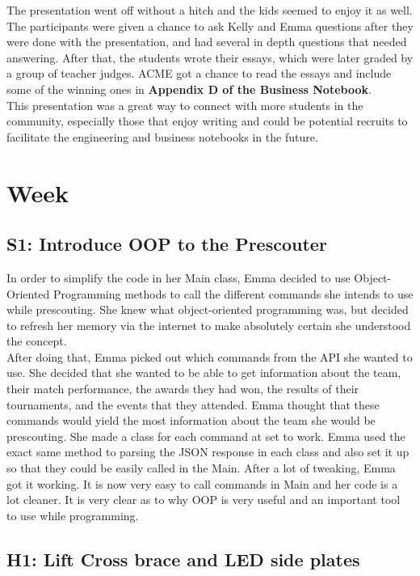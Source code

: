 \documentclass{article}
\begin{document}
The presentation went off without a hitch and the kids seemed to enjoy it as well. The participants were given a chance to ask Kelly and Emma questions after they were done with the presentation, and had several in depth questions that needed answering. After that, the students wrote their essays, which were later graded by a group of teacher judges. ACME got a chance to read the essays and include some of the winning ones in \textbf{Appendix D of the Business Notebook}. \\

This presentation was a great way to connect with more students in the community, especially those that enjoy writing and could be potential recruits to facilitate the engineering and business notebooks in the future. \\


\clearpage \newpage \section{Week \thesection} 
\subsection{S1: Introduce OOP to the Prescouter}

In order to simplify the code in her Main class, Emma decided to use Object-Oriented Programming methods to call the different commands she intends to use while prescouting. She knew what object-oriented programming was, but decided to refresh her memory via the internet to make absolutely certain she understood the concept. \\

After doing that, Emma picked out which commands from the API she wanted to use. She decided that she wanted to be able to get information about the team, their match performance, the awards they had won, the results of their tournaments, and the events that they attended. Emma thought that these commands would yield the most information about the team she would be prescouting. She made a class for each command at set to work. Emma used the exact same method to parsing the JSON response in each class and also set it up so that they could be easily called in the Main. After a lot of tweaking, Emma got it working. It is now very easy to call commands in Main and her code is a lot cleaner. It is very clear as to why OOP is very useful and an important tool to use while programming. 
\subsection{H1: Lift Cross brace and LED side plates}
\end{document}

